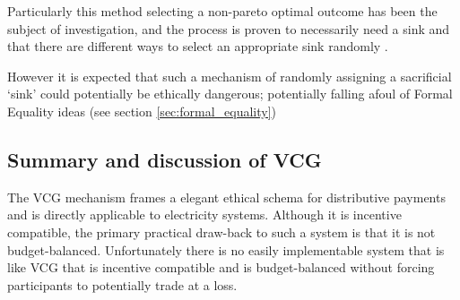Particularly this method selecting a non-pareto optimal outcome has been the subject of investigation, and the process is proven to necessarily need a sink and that there are different ways to select an appropriate sink randomly \cite{NATH2019673}.

However it is expected that such a mechanism of randomly assigning a sacrificial `sink' could potentially be ethically dangerous; potentially falling afoul of Formal Equality ideas (see section \ref{sec:formal_equality})







\subsection{Summary and discussion of VCG}\label{subsec:summary_discussion_VCG}

The VCG mechanism frames a elegant ethical schema for distributive payments and is directly applicable to electricity systems.
Although it is incentive compatible, the primary practical draw-back to such a system is that it is not budget-balanced.
Unfortunately there is no easily implementable system that is like VCG that is incentive compatible and is budget-balanced without forcing participants to potentially trade at a loss.

